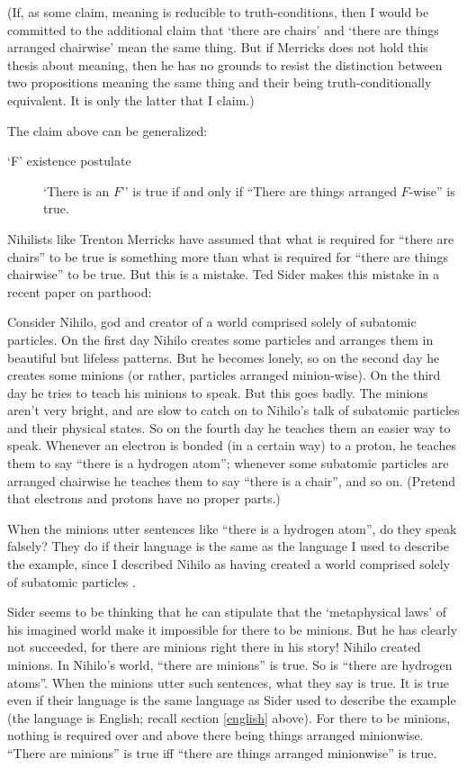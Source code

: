 \documentclass[11pt]{article}
\newenvironment{squote}{%
\begin{spacing}{1}
       	\begin{list}{}{%
\setlength{\labelwidth}{0pt}%
\rightmargin\leftmargin%
}
\item\relax
}{%
\end{list}%
\end{spacing}
}
\begin{document}
\begin{spacing}{1.25}
(If, as some claim, meaning is reducible to truth-conditions, then I
would be committed to the additional claim that `there are chairs' and
`there are things arranged chairwise' mean the same thing.  But if
Merricks does not hold this thesis about meaning, then he has no
grounds to resist the distinction between two propositions meaning the
same thing and their being truth-conditionally equivalent.  It is only
the latter that I claim.)

The claim above can be generalized:

\begin{description}
  \item[`F' existence postulate] `There is an $F$'' is true if and
    only if ``There are things arranged $F$-wise'' is
    true. \label{fwise}
\end{description}

Nihilists like Trenton Merricks have assumed that what is required for
``there are chairs'' to be true is something more than what is
required for ``there are things chairwise'' to be true.  But this is a
mistake.  Ted Sider makes this mistake in a recent paper on parthood:

\begin{squote}
Consider Nihilo, god and creator of a world comprised solely of
subatomic particles.  On the first day Nihilo creates some particles
and arranges them in beautiful but lifeless patterns.  But he becomes
lonely, so on the second day he creates some minions (or rather,
particles arranged minion-wise).  On the third day he tries to teach
his minions to speak.  But this goes badly.  The minions aren't very
bright, and are slow to catch on to Nihilo's talk of subatomic
particles and their physical states.  So on the fourth day he teaches
them an easier way to speak.  Whenever an electron is bonded (in a
certain way) to a proton, he teaches them to say ``there is a hydrogen
atom''; whenever some subatomic particles are arranged chairwise he
teaches them to say ``there is a chair'', and so on.  (Pretend that
electrons and protons have no proper parts.)

When the minions utter sentences like ``there is a hydrogen atom'', do
they speak falsely?  They do if their language is the same as the
language I used to describe the example, since I described Nihilo as
having created a world comprised solely of subatomic particles
\citeyearpar[7]{sider2011c}.
\end{squote}

Sider seems to be thinking that he can stipulate that the
`metaphysical laws' of his imagined world make it impossible for there
to be minions.  But he has clearly not succeeded, for there are
minions right there in his story!  Nihilo created minions.  In
Nihilo's world, ``there are minions'' is true.  So is ``there are
hydrogen atoms''.  When the minions utter such sentences, what they
say is true.  It is true even if their language is the same language
as Sider used to describe the example (the language is English; recall
section \ref{english} above).  For there to be minions, nothing is
required over and above there being things arranged minionwise.
``There are minions'' is true iff ``there are things arranged
minionwise'' is true.


\end{spacing}
\end{document}
